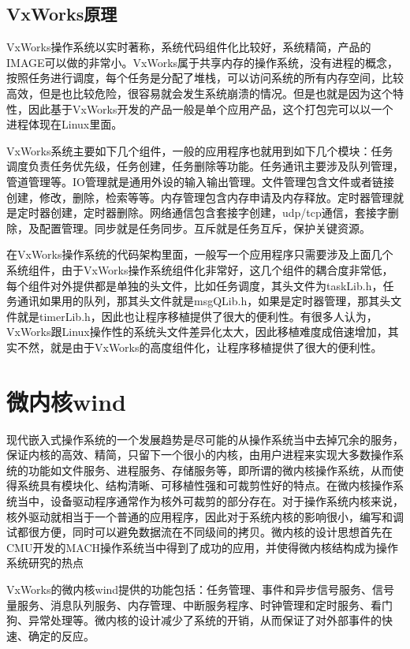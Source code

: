 \subsection{VxWorks原理}
	VxWorks操作系统以实时著称，系统代码组件化比较好，系统精简，产品的IMAGE可以做的非常小。VxWorks属于共享内存的操作系统，没有进程的概念，按照任务进行调度，每个任务是分配了堆栈，可以访问系统的所有内存空间，比较高效，但是也比较危险，很容易就会发生系统崩溃的情况。但是也就是因为这个特性，因此基于VxWorks开发的产品一般是单个应用产品，这个打包完可以以一个进程体现在Linux里面。 
	
	VxWorks系统主要如下几个组件，一般的应用程序也就用到如下几个模块：任务调度负责任务优先级，任务创建，任务删除等功能。任务通讯主要涉及队列管理，管道管理等。IO管理就是通用外设的输入输出管理。文件管理包含文件或者链接创建，修改，删除，检索等等。内存管理包含内存申请及内存释放。定时器管理就是定时器创建，定时器删除。网络通信包含套接字创建，udp/tcp通信，套接字删除，及配置管理。同步就是任务同步。互斥就是任务互斥，保护关键资源。
	
	在VxWorks操作系统的代码架构里面，一般写一个应用程序只需要涉及上面几个系统组件，由于VxWorks操作系统组件化非常好，这几个组件的耦合度非常低，每个组件对外提供都是单独的头文件，比如任务调度，其头文件为taskLib.h，任务通讯如果用的队列，那其头文件就是msgQLib.h，如果是定时器管理，那其头文件就是timerLib.h，因此也让程序移植提供了很大的便利性。有很多人认为，VxWorks跟Linux操作性的系统头文件差异化太大，因此移植难度成倍速增加，其实不然，就是由于VxWorks的高度组件化，让程序移植提供了很大的便利性。
	
	

\section{微内核wind}
	现代嵌入式操作系统的一个发展趋势是尽可能的从操作系统当中去掉冗余的服务，保证内核的高效、精简，只留下一个很小的内核，由用户进程来实现大多数操作系统的功能如文件服务、进程服务、存储服务等，即所谓的微内核操作系统，从而使得系统具有模块化、结构清晰、可移植性强和可裁剪性好的特点。在微内核操作系统当中，设备驱动程序通常作为核外可裁剪的部分存在。对于操作系统内核来说，核外驱动就相当于一个普通的应用程序，因此对于系统内核的影响很小，编写和调试都很方便，同时可以避免数据流在不同级间的拷贝。微内核的设计思想首先在CMU开发的MACH操作系统当中得到了成功的应用，并使得微内核结构成为操作系统研究的热点\cite{Black1992Microkernel}
	
	VxWorks的微内核wind提供的功能包括：任务管理、事件和异步信号服务、信号量服务、消息队列服务、内存管理、中断服务程序、时钟管理和定时服务、看门狗、异常处理等。微内核的设计减少了系统的开销，从而保证了对外部事件的快速、确定的反应。
